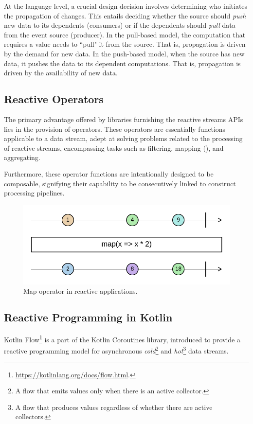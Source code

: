 At the language level, a crucial design decision involves determining who initiates the propagation of changes. This entails deciding whether the source should \textit{push} new data to its dependents (consumers) or if the dependents should \textit{pull} data from the event source (producer). In the pull-based model, the computation that requires a value needs to ``pull" it from the source. That is, propagation is driven by the demand for new data. In the push-based model, when the source has new data, it pushes the data to its dependent computations. That is, propagation is driven by the availability of new data.

\subsection{Reactive Operators}

The primary advantage offered by libraries furnishing the reactive streams APIs lies in the provision of operators. These operators are essentially functions applicable to a data stream, adept at solving problems related to the processing of reactive streams, encompassing tasks such as filtering, mapping (), and aggregating.

Furthermore, these operator functions are intentionally designed to be composable, signifying their capability to be consecutively linked to construct processing pipelines.

\begin{figure}
    \centering
    \includegraphics[width=\linewidth]{figures/map-marble.png}
    \caption{Map operator in reactive applications.}
    \label{fig:reactive-map}
\end{figure}

\subsection{Reactive Programming in Kotlin}

Kotlin Flow\footnote{\url{https://kotlinlang.org/docs/flow.html}.} is a part of the Kotlin Coroutines library, introduced to provide a reactive programming model for asynchronous \textit{cold}\footnote{A flow that emits values only when there is an active collector.} and \textit{hot}\footnote{A flow that produces values regardless of whether there are active collectors.} data streams.

